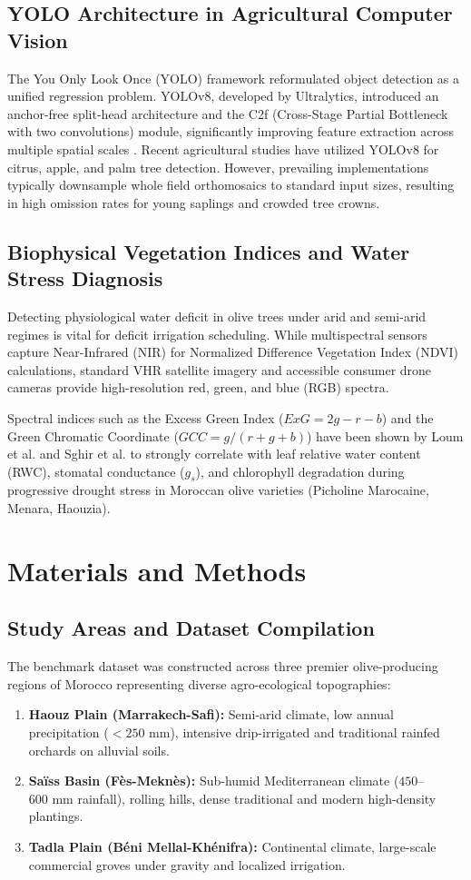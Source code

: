\documentclass[runningheads]{llncs}
\begin{document}
\subsection{YOLO Architecture in Agricultural Computer Vision}
The You Only Look Once (YOLO) framework reformulated object detection as a unified regression problem. YOLOv8, developed by Ultralytics, introduced an anchor-free split-head architecture and the C2f (Cross-Stage Partial Bottleneck with two convolutions) module, significantly improving feature extraction across multiple spatial scales \cite{ref8}. Recent agricultural studies have utilized YOLOv8 for citrus, apple, and palm tree detection. However, prevailing implementations typically downsample whole field orthomosaics to standard input sizes, resulting in high omission rates for young saplings and crowded tree crowns.

\subsection{Biophysical Vegetation Indices and Water Stress Diagnosis}
Detecting physiological water deficit in olive trees under arid and semi-arid regimes is vital for deficit irrigation scheduling. While multispectral sensors capture Near-Infrared (NIR) for Normalized Difference Vegetation Index (NDVI) calculations, standard VHR satellite imagery and accessible consumer drone cameras provide high-resolution red, green, and blue (RGB) spectra. 

Spectral indices such as the Excess Green Index ($ExG = 2g - r - b$) and the Green Chromatic Coordinate ($GCC = g / (r + g + b)$) have been shown by Loum et al. \cite{ref9} and Sghir et al. \cite{ref10} to strongly correlate with leaf relative water content (RWC), stomatal conductance ($g_s$), and chlorophyll degradation during progressive drought stress in Moroccan olive varieties (Picholine Marocaine, Menara, Haouzia).

\section{Materials and Methods}

\subsection{Study Areas and Dataset Compilation}
The benchmark dataset was constructed across three premier olive-producing regions of Morocco representing diverse agro-ecological topographies:
\begin{enumerate}
    \item \textbf{Haouz Plain (Marrakech-Safi):} Semi-arid climate, low annual precipitation ($< 250\text{ mm}$), intensive drip-irrigated and traditional rainfed orchards on alluvial soils.
    \item \textbf{Saïss Basin (Fès-Meknès):} Sub-humid Mediterranean climate ($450$--$600\text{ mm}$ rainfall), rolling hills, dense traditional and modern high-density plantings.
    \item \textbf{Tadla Plain (Béni Mellal-Khénifra):} Continental climate, large-scale commercial groves under gravity and localized irrigation.
\end{enumerate}
\end{document}
